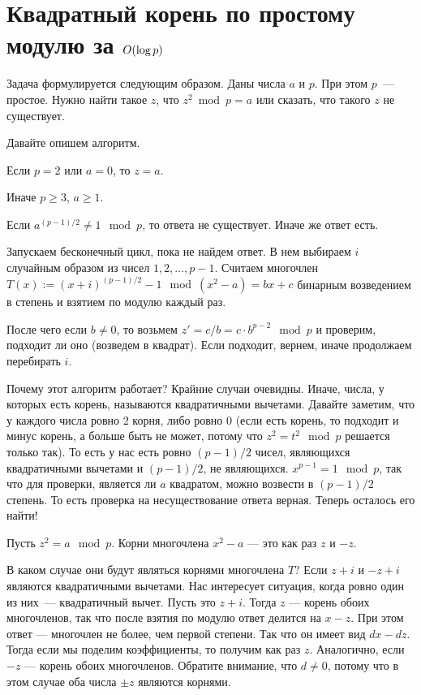 \chapter{Квадратный корень по простому модулю за $O(\log p)$}


Задача формулируется следующим образом.
Даны числа $a$ и $p$. При этом $p$~--- простое. Нужно найти такое $z$, что $z^2 \bmod p = a$ или сказать, что такого $z$ не существует.

Давайте опишем алгоритм.

Если $p = 2$ или $a = 0$, то $z = a$.

Иначе $p \ge 3$, $a \ge 1$.

Если $a^{(p-1)/2} \neq 1 \mod p$,  то ответа не существует. Иначе же ответ есть.

Запускаем бесконечный цикл, пока не найдем ответ. В нем выбираем $i$ случайным образом из чисел $1, 2, \ldots, p - 1$. Считаем многочлен $T(x)  := (x+i)^{(p-1)/2} - 1 \mod (x^2 - a) = bx + c$ бинарным возведением в степень и взятием по модулю каждый раз.

После чего если $b \neq 0$, то возьмем $z' = c/b = c \cdot b^{p - 2} \mod p$ и проверим, подходит ли оно (возведем в квадрат). Если подходит, вернем, иначе продолжаем перебирать $i$.

Почему этот алгоритм работает?
Крайние случаи очевидны. Иначе, числа, у которых есть корень, называются квадратичными вычетами. Давайте заметим, что у каждого числа ровно $2$ корня, либо ровно $0$ (если есть корень, то подходит и минус корень, а больше быть не может, потому что $z^2 = t^2 \mod p$ решается только так). То есть у нас есть ровно $(p-1)/2$ чисел, являющихся квадратичными вычетами и $(p-1)/2$, не являющихся.
$x^{p-1} = 1 \mod p$, так что для проверки, является ли $a$ квадратом, можно возвести в $(p-1)/2$ степень. То есть проверка на несуществование ответа верная. Теперь осталось его найти!

Пусть $z^2 = a \mod p$.
Корни многочлена $x^2 - a$ — это как раз $z$ и $-z$.

В каком случае они будут являться корнями многочлена $T$? Если $z + i$ и $-z + i$ являются квадратичными вычетами. Нас интересует ситуация, когда ровно один из них~--- квадратичный вычет. Пусть это $z + i$. Тогда $z$ — корень обоих многочленов, так что после взятия по модулю ответ делится на $x - z$. При этом ответ — многочлен не более, чем первой степени. Так что он имеет вид $dx - dz$. Тогда если мы поделим коэффициенты, то получим как раз $z$. Аналогично, если $-z$ — корень обоих многочленов. Обратите внимание, что $d \neq 0$, потому что в этом случае оба числа $\pm z$ являются корнями.

